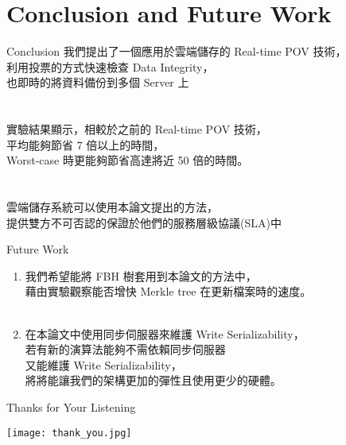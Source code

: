 \section{Conclusion and Future Work}

\begin{frame}{Conclusion}
	我們提出了一個應用於雲端儲存的 Real-time POV 技術，\\
    利用投票的方式快速檢查 Data Integrity，\\
    也即時的將資料備份到多個 Server 上\\
    ~\\
    ~\\
    實驗結果顯示，相較於之前的 Real-time POV 技術，\\
    平均能夠節省 7 倍以上的時間，\\
    Worst-case 時更能夠節省高達將近 50 倍的時間。\\
    ~\\
    ~\\
    雲端儲存系統可以使用本論文提出的方法，\\
    提供雙方不可否認的保證於他們的服務層級協議(SLA)中
\end{frame}

\begin{frame}{Future Work}
	\begin{enumerate}
		\item 我們希望能將 FBH 樹套用到本論文的方法中，\\
        藉由實驗觀察能否增快 Merkle tree 在更新檔案時的速度。\\
        ~\\
        \item 在本論文中使用同步伺服器來維護 Write Serializability，\\
        若有新的演算法能夠不需依賴同步伺服器\\
        又能維護 Write Serializability，\\
        將將能讓我們的架構更加的彈性且使用更少的硬體。
	\end{enumerate}
\end{frame}

\begin{frame}{Thanks for Your Listening}
	\begin{center}
		\texttt{[image: thank\_you.jpg]}
	\end{center}	
\end{frame}